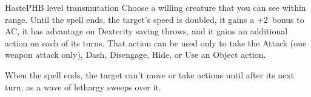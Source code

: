 \begin{spell}{Haste}{PHB}{ level transmutation}
{
}
Choose a willing creature that you can see within range.
Until the spell ends, the target's speed is doubled, it
gains a +2~bonus to AC, it has advantage on Dexterity
saving throws, and it gains an additional action on each
of its turns. That action can be used only to take the
Attack (one weapon attack only), Dash, Disengage, Hide,
or Use an Object action.

When the spell ends, the target can't move or take
actions until after its next turn, as a wave of lethargy
sweeps over it.
\end{spell}
